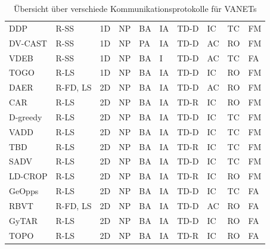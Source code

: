 \documentclass[english,runningheads,a4paper]{llncs}[2018/03/10]
\begin{document}
\begin{landscape}
\begin{table}[]
\begin{tabular}{p{2cm}p{1.8cm}p{1.8cm}p{1.8cm}p{2.5cm}p{1.8cm}p{1.8cm}p{1.8cm}p{1.5cm}p{1.7cm}}
    DDP                           & R-SS     & 1D & NP    & BA & IA     & TD-D     & IC    & TC & FM \\
    DV-CAST                       & R-SS     & 1D & NP    & PA & IA     & TD-D     & AC    & RO & FM \\
    VDEB                          & R-SS     & 1D & NP    & BA & I      & TD-D     & AC    & TC & FA \\
    TOGO                          & R-LS     & 1D & NP    & BA & IA     & TD-D     & IC    & RO & FM \\
    DAER                          & R-FD, LS & 2D & NP    & BA & IA     & TD-D     & AC    & RO & FM \\
    CAR                           & R-LS     & 2D & NP    & BA & IA     & TD-R     & IC    & RO & FM \\
    D-greedy                      & R-LS     & 2D & NP    & BA & IA     & TD-D     & IC    & TC & FM \\
    VADD                          & R-LS     & 2D & NP    & BA & IA     & TD-D     & IC    & TC & FM \\
    TBD                           & R-LS     & 2D & NP    & BA & IA     & TD-R     & IC    & TC & FM \\
    SADV                          & R-LS     & 2D & NP    & BA & IA     & TD-D     & IC    & TC & FM \\
    LD-CROP                       & R-LS     & 2D & NP    & BA & IA     & TD-R     & IC    & RO & FM \\
    GeOpps                        & R-LS     & 2D & NP    & BA & IA     & TD-D     & IC    & TC & FA \\
    RBVT                          & R-FD, LS & 2D & NP    & BA & IA     & TD-D     & AC    & RO & FA \\
    GyTAR                         & R-LS     & 2D & NP    & BA & IA     & TD-D     & IC    & RO & FA \\
    TOPO                          & R-LS     & 2D & NP    & BA & IA     & TD-R     & IC    & RO & FA \\
     \bottomrule
    \end{tabular}
  \caption{Übersicht über verschiede Kommunikationsprotokolle für VANETs\cite{conti2013mobile}}
  \label{table:1}
\end{table}
\end{landscape}
\end{document}
